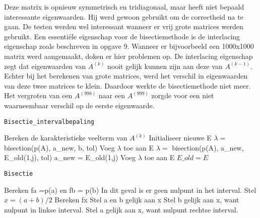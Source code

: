 Deze matrix is opnieuw symmetrisch en tridiagonaal, maar heeft niet bepaald interessante eigenwaarden. Hij werd gewoon gebruikt om de correctheid na te gaan. De testen werden wel interessant wanneer er vrij grote matrices werden gebruikt. Een essenti\"ele eigenschap voor de bisectiemethode is de interlacing eigenschap zoals beschreven in opgave 9. Wanneer er bijvoorbeeld een 1000x1000 matrix werd aangemaakt, doken er hier problemen op. De interlacing eigenschap zegt dat eigenwaarden van $A^{(k)}$ nooit gelijk kunnen zijn aan deze van $A^{(k-1)}$. Echter bij het berekenen van grote matrices, werd het verschil in eigenwaarden van deze twee matrices te klein. Daardoor werkte de bisectiemethode niet meer. Het vergroten van een $A^{(998)}$ naar een $A^{(999)}$ zorgde voor een niet waarneembaar verschil op de eerste eigenwaarde.\\



\begin{algorithm}[ht!]
	\caption{\texttt{Bisectie\_intervalbepaling}}
	\label{Bisectie_intervalbepaling}
	\begin{algorithmic}[1]
			\State Bereken de karakteristieke veelterm van $A^{(k)}$
			\State Initialiseer nieuwe E
				\State $\lambda =$ bisection(p(A), a\_new, b, tol)
				\State Voeg $\lambda$ toe aan E	
			\Else
				\State $\lambda =$  bisection(p(A), a\_new, E\_old(1,j), tol)
				\State a\_new = E\_old(1,j)
				\State Voeg $\lambda$ toe aan E
			\EndIf
			\EndFor
			\State $E\_old = E$
		\EndFor
		\State {}
		\EndProcedure
	\end{algorithmic}
\end{algorithm}

\begin{algorithm}[ht!]
	\caption{\texttt{Bisectie}}
	\label{Bisectie}
	\begin{algorithmic}[1]
			\State Bereken fa =p(a) en fb = p(b)
				\State In dit geval is er geen nulpunt in het interval.
				\State {}
			\Else
				\State Stel $x = (a+b)/2$
				\State Bereken fx
				\State Stel a en b gelijk aan x
				\State Stel b gelijk aan x, want nulpunt in linkse interval.
			\Else
				\State Stel a gelijk aan x, want nulpunt rechtse interval.
			\EndIf
			\EndIf
		\EndWhile
		\State {}
		\EndProcedure
	\end{algorithmic}
\end{algorithm}